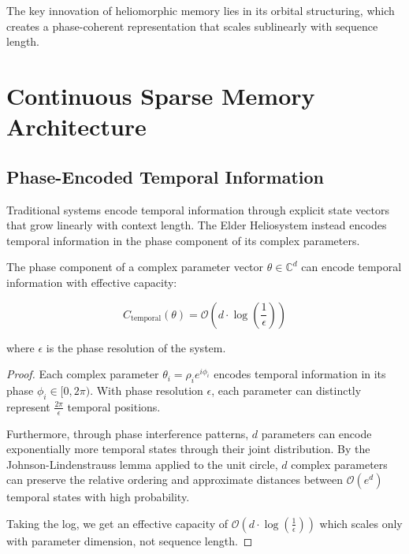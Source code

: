 The key innovation of heliomorphic memory lies in its orbital structuring, which creates a phase-coherent representation that scales sublinearly with sequence length.

\section{Continuous Sparse Memory Architecture}

\subsection{Phase-Encoded Temporal Information}

Traditional systems encode temporal information through explicit state vectors that grow linearly with context length. The Elder Heliosystem instead encodes temporal information in the phase component of its complex parameters.

\begin{theorem}
The phase component of a complex parameter vector $\theta \in \mathbb{C}^d$ can encode temporal information with effective capacity:

\begin{equation}
C_{\text{temporal}}(\theta) = \mathcal{O}(d \cdot \log(\frac{1}{\epsilon}))
\end{equation}

where $\epsilon$ is the phase resolution of the system.
\end{theorem}

\begin{proof}
Each complex parameter $\theta_i = \rho_i e^{i\phi_i}$ encodes temporal information in its phase $\phi_i \in [0, 2\pi)$. With phase resolution $\epsilon$, each parameter can distinctly represent $\frac{2\pi}{\epsilon}$ temporal positions.

Furthermore, through phase interference patterns, $d$ parameters can encode exponentially more temporal states through their joint distribution. By the Johnson-Lindenstrauss lemma applied to the unit circle, $d$ complex parameters can preserve the relative ordering and approximate distances between $\mathcal{O}(e^{d})$ temporal states with high probability.

Taking the log, we get an effective capacity of $\mathcal{O}(d \cdot \log(\frac{1}{\epsilon}))$ which scales only with parameter dimension, not sequence length.
\end{proof}

